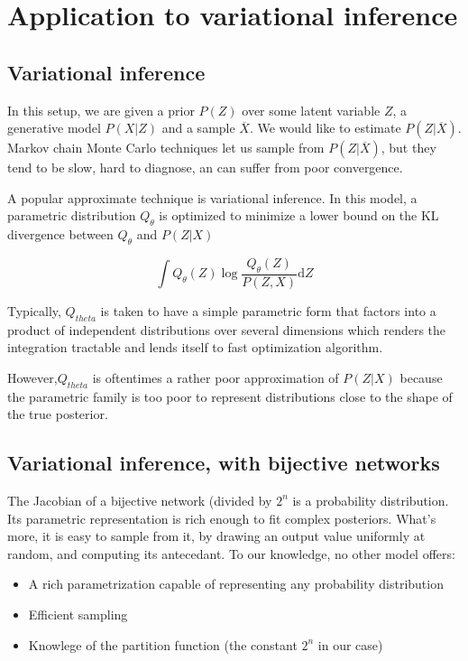 \documentclass{article}
\begin{document}
\section{Application to variational inference}

\subsection{Variational inference}

In this setup, we are given a prior \(P(Z)\) over some latent variable \(Z\),
a generative model \(P(X | Z)\) and a sample \(\overline{X}\). We would like to
estimate \(P(Z | \overline{X})\). Markov chain Monte Carlo techniques let us
sample from \(P(Z | \overline{X})\), but they tend to be slow,
hard to diagnose, an can suffer from poor convergence.

A popular approximate technique is variational inference. In this model, a
parametric distribution \(Q_{\theta}\) is optimized to minimize a lower bound
on the KL divergence between \(Q_{\theta}\) and \(P(Z | X)\)

\[
  \int Q_{\theta}(Z) \log \frac{Q_{\theta}(Z)}{P(Z, X)} \mathrm{d}Z
\]

Typically, \(Q_{theta}\) is taken to have a simple parametric form that factors
into a product of independent distributions over several dimensions which
renders the integration tractable and lends itself to  fast optimization
algorithm.

However,\(Q_{theta}\) is oftentimes a rather poor approximation of
\(P(Z | X)\) because the parametric family is too poor to represent
distributions close to the shape of the true posterior.

\subsection{Variational inference, with bijective networks}

The Jacobian of a bijective network (divided by \(2^n\)
is a probability distribution. Its parametric representation is rich
enough to fit complex posteriors. What's more, it is easy to sample from it,
by drawing an output value uniformly at random, and computing its antecedant.
To our knowledge, no other model offers:

\begin{itemize}
\item A rich parametrization capable of representing any probability
  distribution
\item Efficient sampling
\item Knowlege of the partition function (the constant \(2^n\) in our case)
\end{itemize}
\end{document}
